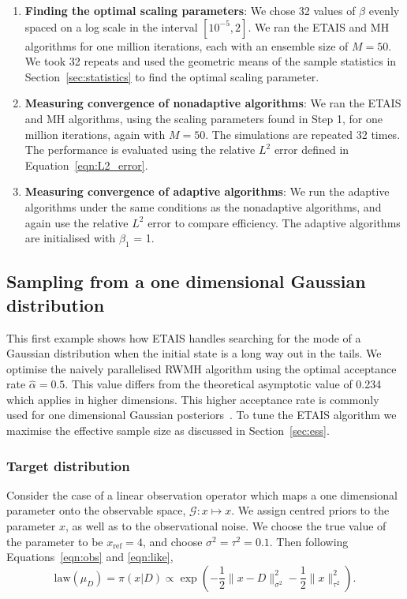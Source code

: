 \documentclass[final]{siamltex}
\newcommand{\G}{\mathcal{G}}
\begin{document}
\begin{enumerate}
	\item {\bf Finding the optimal scaling parameters}: We chose 32 values of $\beta$ evenly spaced on a log scale in the interval $[10^{-5}, 2]$. We ran the ETAIS and MH algorithms for one million iterations, each with an ensemble size of $M=50$. We took 32 repeats and used the geometric means of the sample statistics in Section~\ref{sec:statistics} to find the optimal scaling parameter.
	\item {\bf Measuring convergence of nonadaptive algorithms}: We ran the ETAIS and MH algorithms, using the scaling parameters found in Step 1, for one million iterations, again with $M=50$. The simulations are repeated 32 times. The performance is evaluated using the relative $L^2$ error defined in Equation~\eqref{eqn:L2_error}.
	\item {\bf Measuring convergence of adaptive algorithms}: We run the
adaptive algorithms under the same conditions as the nonadaptive
algorithms, and again use the relative $L^2$ error to compare
efficiency. The adaptive algorithms are initialised with $\beta_1$ = 1.
\end{enumerate}


\subsection{Sampling from a one dimensional Gaussian distribution}
\label{sec:problem 1}

This first example shows how ETAIS handles searching for the mode of a
Gaussian distribution when the initial state is a long way out in the
tails. We optimise the
naively parallelised RWMH algorithm using the optimal acceptance rate
$\hat{\alpha} = 0.5$. This value differs from the theoretical
asymptotic value of 0.234 which applies in higher dimensions. This
higher acceptance rate is commonly used for one dimensional Gaussian
posteriors~\cite{rosenthal2011optimal}. To tune the
ETAIS algorithm we maximise the effective sample size as
discussed in Section~\ref{sec:ess}.


\subsubsection{Target distribution}

Consider the case of a linear observation operator which maps a one
dimensional parameter onto the observable space, $\G\colon x \mapsto
x$. We assign centred priors to the parameter $x$, as well as to the
observational noise. We choose the true value of the parameter to be
$x_\text{ref} = 4$, and choose $\sigma^2=\tau^2=0.1$. Then
following Equations~\eqref{eqn:obs} and \eqref{eqn:like},
\begin{equation}\label{eqn:Gaussian posterior}
	\text{law}(\mu_D) = \pi(x|D) \propto \exp\left(-\frac{1}{2}\big\|x
	 - D\big\|^2_{\sigma^2} - \frac{1}{2}\big\|x\big\|^2_{\tau^2}\right).
\end{equation}
\end{document}
